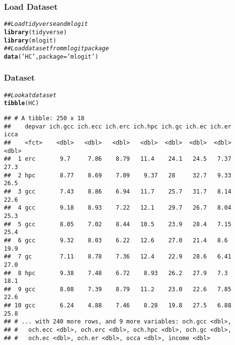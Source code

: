 \documentclass{beamer}\usepackage[]{graphicx}\usepackage[]{color}
\makeatletter
\newcommand{\hlstr}[1]{\textcolor[rgb]{0.192,0.494,0.8}{#1}}%
\newcommand{\hlcom}[1]{\textcolor[rgb]{0.678,0.584,0.686}{\textit{#1}}}%
\newcommand{\hlstd}[1]{\textcolor[rgb]{0.345,0.345,0.345}{#1}}%
\newcommand{\hlkwc}[1]{\textcolor[rgb]{0.333,0.667,0.333}{#1}}%
\newcommand{\hlkwd}[1]{\textcolor[rgb]{0.737,0.353,0.396}{\textbf{#1}}}%
\newenvironment{kframe}{%
 \def\at@end@of@kframe{}%
 \ifinner\ifhmode%
  \def\at@end@of@kframe{\end{minipage}}%
  \begin{minipage}{\columnwidth}%
 \fi\fi%
 \def\FrameCommand##1{\hskip\@totalleftmargin \hskip-\fboxsep
 \colorbox{shadecolor}{##1}\hskip-\fboxsep
     \hskip-\linewidth \hskip-\@totalleftmargin \hskip\columnwidth}%
 \MakeFramed {\advance\hsize-\width
   \@totalleftmargin\z@ \linewidth\hsize
   \@setminipage}}%
 {\par\unskip\endMakeFramed%
 \at@end@of@kframe}
\newenvironment{knitrout}{}{} %
\makeatother
\begin{document}
\begin{frame}[fragile]\frametitle{Load Dataset}
\begin{knitrout}\footnotesize
{}\color{fgcolor}\begin{kframe}
\begin{alltt}
\hlcom{## Load tidyverse and mlogit}
\hlkwd{library}\hlstd{(tidyverse)}
\hlkwd{library}\hlstd{(mlogit)}
\hlcom{## Load dataset from mlogit package}
\hlkwd{data}\hlstd{(}\hlstr{'HC'}\hlstd{,} \hlkwc{package} \hlstd{=} \hlstr{'mlogit'}\hlstd{)}
\end{alltt}
\end{kframe}
\end{knitrout}
\end{frame}

\begin{frame}[fragile]\frametitle{Dataset}
\begin{knitrout}\footnotesize
{}\color{fgcolor}\begin{kframe}
\begin{alltt}
\hlcom{## Look at dataset}
\hlkwd{tibble}\hlstd{(HC)}
\end{alltt}
\begin{verbatim}
## # A tibble: 250 x 18
##    depvar ich.gcc ich.ecc ich.erc ich.hpc ich.gc ich.ec ich.er  icca
##    <fct>    <dbl>   <dbl>   <dbl>   <dbl>  <dbl>  <dbl>  <dbl> <dbl>
##  1 erc       9.7     7.86    8.79   11.4    24.1   24.5   7.37  27.3
##  2 hpc       8.77    8.69    7.09    9.37   28     32.7   9.33  26.5
##  3 gcc       7.43    8.86    6.94   11.7    25.7   31.7   8.14  22.6
##  4 gcc       9.18    8.93    7.22   12.1    29.7   26.7   8.04  25.3
##  5 gcc       8.05    7.02    8.44   10.5    23.9   28.4   7.15  25.4
##  6 gcc       9.32    8.03    6.22   12.6    27.0   21.4   8.6   19.9
##  7 gc        7.11    8.78    7.36   12.4    22.9   28.6   6.41  27.0
##  8 hpc       9.38    7.48    6.72    8.93   26.2   27.9   7.3   18.1
##  9 gcc       8.08    7.39    8.79   11.2    23.0   22.6   7.85  22.6
## 10 gcc       6.24    4.88    7.46    8.28   19.8   27.5   6.88  25.8
## # ... with 240 more rows, and 9 more variables: och.gcc <dbl>,
## #   och.ecc <dbl>, och.erc <dbl>, och.hpc <dbl>, och.gc <dbl>,
## #   och.ec <dbl>, och.er <dbl>, occa <dbl>, income <dbl>
\end{verbatim}
\end{kframe}
\end{knitrout}
\end{frame}
\end{document}
